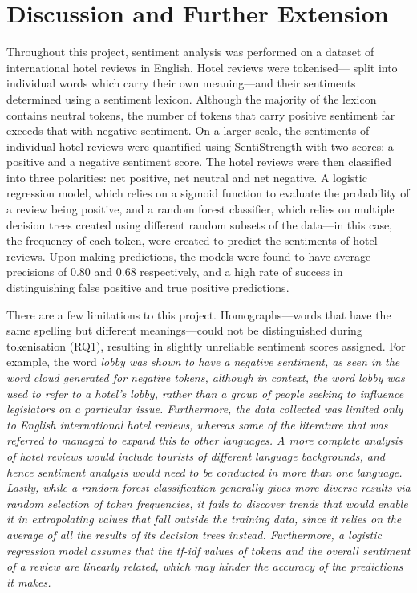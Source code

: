 \documentclass[12pt,bibliography=totocnumbered]{scrartcl}
\begin{document}
{\section{Discussion and Further Extension}
Throughout this project, sentiment analysis was performed on a dataset of
international hotel reviews in English. Hotel reviews were tokenised---
split into individual words which carry their own meaning---and their sentiments
determined using a sentiment lexicon. Although the majority of the lexicon
contains neutral tokens, the number of tokens that carry positive sentiment
far exceeds that with negative sentiment. On a larger scale, the sentiments
of individual hotel reviews were quantified using SentiStrength with two scores:
a positive and a negative sentiment score. The hotel reviews were then classified
into three polarities: net positive, net neutral and net negative. A logistic
regression model, which relies on a sigmoid function to evaluate the probability
of a review being positive, and a random forest classifier, which relies on multiple
decision trees created using different random subsets of the data---in this case, the
frequency of each token, were created to predict the sentiments of hotel reviews. Upon
making predictions, the models were found to have average precisions of $0.80$ and $0.68$
respectively, and a high rate of success in distinguishing false positive
and true positive predictions.

There are a few limitations to this project. Homographs---words that have the same spelling
but different meanings---could not be distinguished during tokenisation (RQ1), resulting in
slightly unreliable sentiment scores assigned. For example, the word \it{lobby} was shown to
have a negative sentiment, as seen in the word cloud generated for negative tokens, although
in context, the word \it{lobby} was used to refer to a hotel's lobby, rather than a group of
people seeking to influence legislators on a particular issue. Furthermore, the data collected
was limited only to English international hotel reviews, whereas some of the literature that was
referred to managed to expand this to other languages. A more complete analysis of hotel reviews
would include tourists of different language backgrounds, and hence sentiment analysis would need
to be conducted in more than one language. Lastly, while a random forest classification generally
gives more diverse results via random selection of token frequencies, it fails to discover trends
that would enable it in extrapolating values that fall outside the training data,
since it relies on the average of all the results of its decision trees instead. Furthermore,
a logistic regression model assumes that the \it{tf-idf} values of tokens and the overall sentiment
of a review are linearly related, which may hinder the accuracy of the predictions it makes.

}
\end{document}
